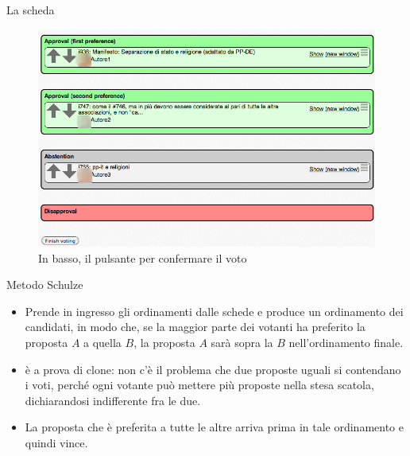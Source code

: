 \documentclass[ignorenonframetext,11pt]{beamer}\usetheme{default}
\begin{document}
\begin{frame}{La scheda}
\begin{figure}\includegraphics[width=.9\textwidth]{pics/scheda}
\caption{In basso, il pulsante per confermare il voto}
\end{figure}
\end{frame}

\begin{frame}{Metodo Schulze}
\begin{itemize}
\item Prende in ingresso gli ordinamenti dalle schede e produce un ordinamento dei candidati, in modo che, se la maggior parte dei votanti ha preferito la proposta $A$ a quella $B$, la proposta $A$ sarà sopra la $B$ nell'ordinamento finale.
\item è a prova di clone: non c'è il problema che due proposte uguali si contendano i voti, perché ogni votante può mettere più proposte nella stesa scatola, dichiarandosi indifferente fra le due.
\item \alert{La proposta che è preferita a tutte le altre arriva prima in tale ordinamento e quindi vince}.
\end{itemize}
\end{frame}
\end{document}
